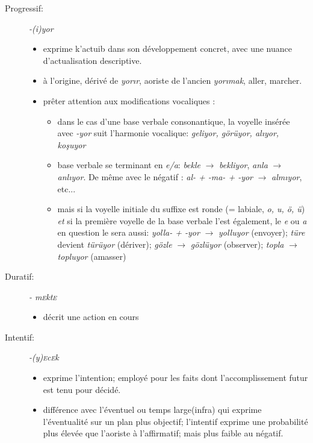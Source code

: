 \documentclass{cours}
\newcommand{\ch}{\c{s}}
\newcommand{\sce}{\textsc{e}}
\begin{document}
\begin{description}
    \item[Progressif:] {\sl -(i)yor}
        \begin{itemize}
            \item exprime k'actuib dans son développement concret, avec une nuance d'actualisation descriptive.
            \item à l'origine, dérivé de \textsl{yor\i r}, aoriste de l'ancien \textsl{yor\i mak}, \og aller, marcher\fg.
            \item prêter attention aux modifications vocaliques :
                  \begin{itemize}[label = \textbullet]
                      \item dans le cas d'une base verbale consonantique, la voyelle insérée avec \textsl{-yor} suit l'harmonie vocalique: \textsl{geliyor, görüyor, al\i yor, ko\ch uyor}
                      \item base verbale se terminant en \textsl{e/a}: \textsl{bekle} $\to$ \textsl{bekliyor}, \textsl{anla} $\to$ \textsl{anl\i yor}. De même avec le négatif : \textsl{al- + -ma- + -yor} $\to$ \textsl{alm\i yor}, etc...
                      \item mais si la voyelle initiale du suffixe est \og ronde \fg (= labiale, \textsl{o, u, ö, ü}) \emph{et} si la première voyelle de la base verbale l'est également, le \textsl{e} ou {\sl a} en question le sera aussi: \textsl{yolla- + -yor} $\to$ \textsl{yolluyor} (envoyer); \textsl{türe} devient \textsl{türüyor} (dériver); \textsl{gözle} $\to$ \textsl{gözlüyor} (observer); \textsl{topla} $\to$ \textsl{topluyor} (amasser)
                  \end{itemize}
        \end{itemize}
    \item [Duratif:] {\sl - m\sce kt\sce}
          \begin{itemize}
              \item décrit une action en cours
          \end{itemize}
    \item [Intentif:] {\sl -(y)\sce c\sce k}
          \begin{itemize}
              \item exprime l'intention; employé pour les faits dont l'accomplissement futur est tenu pour décidé.
              \item différence avec l'éventuel ou \og temps large\fg (infra) qui exprime l'éventualité sur un plan plus objectif; l'intentif exprime une probabilité plus élevée que l'aoriste à l'affirmatif; mais plus faible au négatif.

\end{itemize}
\end{description}
\end{document}
